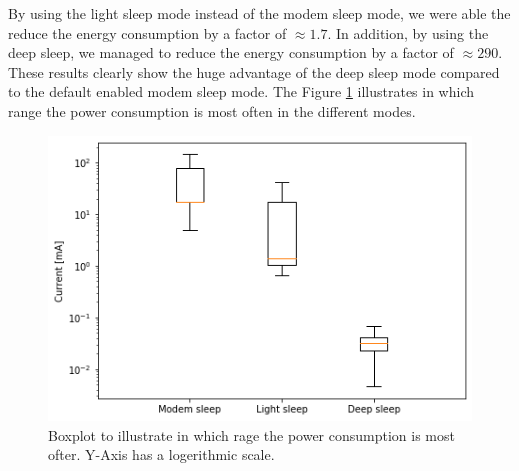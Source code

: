 By using the light sleep mode instead of the modem sleep mode, we were able the reduce the energy consumption by a factor of $\approx 1.7$.
In addition, by using the deep sleep, we managed to reduce the energy consumption by a factor of $\approx 290$.
These results clearly show the huge advantage of the deep sleep mode compared to the default enabled modem sleep mode.
The Figure \ref{fig:sleep_compare_boxplot} illustrates in which range the power consumption is most often in the different modes.

\begin{figure}[h]
    \includegraphics[width = \linewidth]{fig/sleep_compare_boxplot.png}
    \caption{Boxplot to illustrate in which rage the power consumption is most ofter. Y-Axis has a logerithmic scale.}
    \label{fig:sleep_compare_boxplot}
\end{figure}